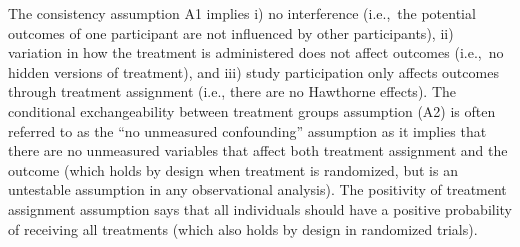\documentclass[11pt]{article}
\begin{document}
The consistency assumption A1 implies i) no interference (i.e.,~the potential outcomes of one participant are not influenced by other participants), ii) variation in how the treatment is administered does not affect outcomes \cite{vanderweele2013causal} (i.e.,~no hidden versions of treatment), and iii) study participation only affects outcomes through treatment assignment (i.e., there are no Hawthorne effects). The conditional exchangeability between treatment groups assumption (A2) is often referred to as the ``no unmeasured confounding'' assumption as it implies that there are no unmeasured variables that affect both treatment assignment and the outcome (which holds by design when treatment is randomized, but is an untestable assumption in any observational analysis). The positivity of treatment assignment assumption says that all individuals should have a positive probability of receiving all treatments (which also holds by design in randomized trials).
\end{document}
